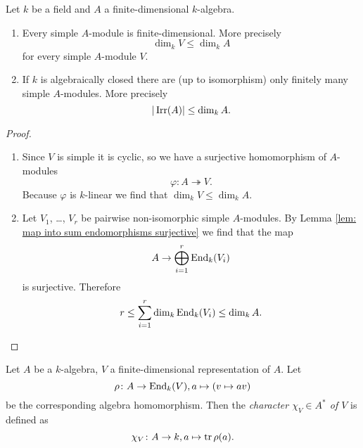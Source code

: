 \begin{prop}\label{prop: simple modules over finite-dimensional algebras}
 Let $k$ be a field and $A$ a finite-dimensional $k$-algebra.
 \begin{enumerate}[label=\emph{\alph*)},leftmargin=*]
  \item
   Every simple $A$-module is finite-dimensional. More precisely
   \[
    \dim_k V \leq \dim_k A
   \]
   for every simple $A$-module $V$.
  \item
   If $k$ is algebraically closed there are (up to isomorphism) only finitely many simple $A$-modules. More precisely
   \[
    |\operatorname{Irr}(A)| \leq \dim_k A.
   \]
 \end{enumerate}
\end{prop}
\begin{proof}
 \begin{enumerate}[label=\emph{\alph*)},leftmargin=*]
  \item
   Since $V$ is simple it is cyclic, so we have a surjective homomorphism of $A$-modules
   \[
    \varphi \colon A \twoheadrightarrow V.
   \]
   Because $\varphi$ is $k$-linear we find that $\dim_k V \leq \dim_k A$.
  \item
   Let $V_1$, \dots, $V_r$ be pairwise non-isomorphic simple $A$-modules. By Lemma \ref{lem: map into sum endomorphisms surjective} we find that the map
   \[
    A \to \bigoplus_{i=1}^r \operatorname{End}_k(V_i)
   \]
   is surjective. Therefore
   \[
    r \leq \sum_{i=1}^r \dim_k \operatorname{End}_k(V_i) \leq \dim_k A.
    \qedhere
   \]
 \end{enumerate}
\end{proof}


\begin{defi}
 Let $A$ be a $k$-algebra, $V$ a finite-dimensional representation of $A$. Let
 \[
  \rho \colon A \to \operatorname{End}_k(V), a \mapsto (v \mapsto av)
 \]
 be the corresponding algebra homomorphism. Then the \emph{character $\chi_V \in A^*$ of $V$} is defined as
 \[
  \chi_V \colon A \to k, a \mapsto \operatorname{tr} \rho(a).
 \]
\end{defi}


